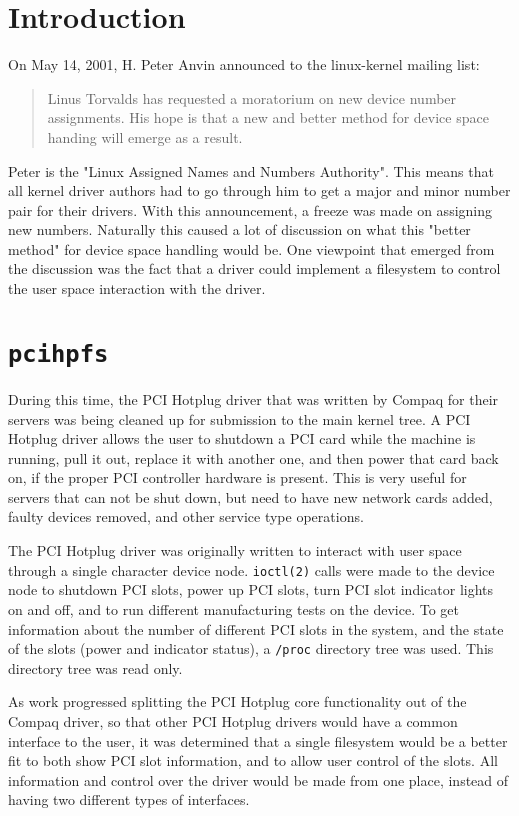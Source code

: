 \documentclass[twocolumn]{article}
\begin{document}
\section{Introduction}
On May 14, 2001, H. Peter Anvin announced to the linux-kernel mailing list:
\begin {quote}
Linus Torvalds has requested a moratorium on new 
device number assignments. His hope is that a new 
and better method for device space handing will 
emerge as a result.
\end {quote}

Peter is the "Linux Assigned Names and Numbers Authority".  This means that
all kernel driver authors had to go through him to get a major and minor
number pair for their drivers.  With this announcement, a freeze was made
on assigning new numbers.  Naturally this caused a lot of discussion on
what this "better method" for device space handling would be.  One
viewpoint that emerged from the discussion was the fact that a driver
could implement a filesystem to control the user space interaction with the
driver.

\section{\tt pcihpfs}
During this time, the PCI Hotplug driver that was written by Compaq for
their servers was being cleaned up for submission to the main kernel tree.
A PCI Hotplug driver allows the user to shutdown a PCI card while the
machine is running, pull it out, replace it with another one, and then
power that card back on, if the proper PCI controller hardware is present.
This is very useful for servers that can not be shut down, but need to have
new network cards added, faulty devices removed, and other service type
operations.

The PCI Hotplug driver was originally written to interact with user space
through a single character device node.  {\tt ioctl(2)} calls were made to
the device node to shutdown PCI slots, power up PCI slots, turn PCI slot
indicator lights on and off, and to run different manufacturing tests on
the device.  To get information about the number of different PCI slots in
the system, and the state of the slots (power and indicator status), a 
{\tt /proc} directory tree was used.  This directory tree was read only.

As work progressed splitting the PCI Hotplug core functionality out of the
Compaq driver, so that other PCI Hotplug drivers would have a common
interface to the user, it was determined that a single filesystem would be
a better fit to both show PCI slot information, and to allow user control
of the slots.  All information and control over the driver would be made
from one place, instead of having two different types of interfaces.
\end{document}
